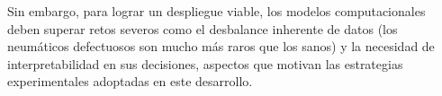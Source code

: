 Sin embargo, para lograr un despliegue viable, los modelos computacionales deben superar retos severos como el desbalance inherente de datos (los neumáticos defectuosos son mucho más raros que los sanos) y la necesidad de interpretabilidad en sus decisiones, aspectos que motivan las estrategias experimentales adoptadas en este desarrollo.
